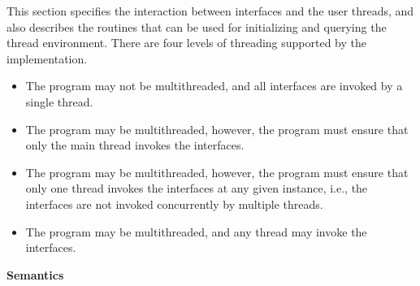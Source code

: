 This section specifies the interaction between \openshmem{} interfaces and the
user threads, and also describes the routines that can be used for initializing and 
querying the thread environment. There are four levels of threading supported by
the \openshmem{} implementation.
 
\begin{itemize}
\item {\bf {}} The \openshmem{} program may not be multithreaded, 
and all \openshmem{} interfaces are invoked by a single thread. 

\item {\bf {}}
The \openshmem{} program may be multithreaded, however, the 
program must ensure that only the main thread invokes the \openshmem{}
interfaces.

\item {\bf {}} 
The \openshmem{} program may be multithreaded, however, the 
program must ensure that only one thread invokes the \openshmem{}
interfaces at any given instance, i.e., the \openshmem{} interfaces 
are not invoked concurrently by multiple threads.

\item {\bf {}}
The \openshmem{} program may be multithreaded, and any 
thread may invoke the \openshmem{} interfaces.
\end{itemize}

\hspace{-15pt}
{\bf Semantics}


